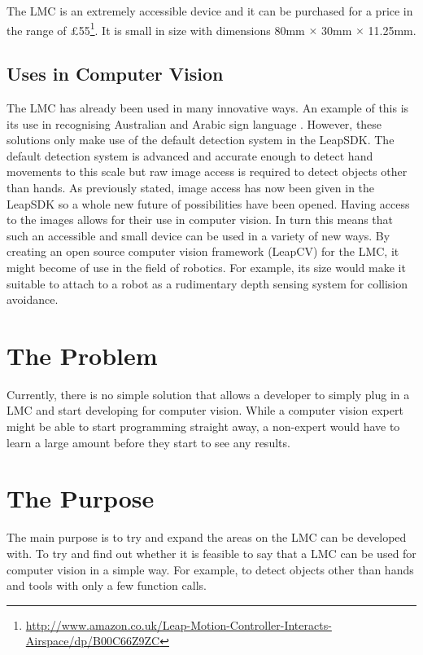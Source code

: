 \documentclass[11pt,oneside]{report}
\begin{document}
				The LMC is an extremely accessible device and it can be purchased for a price in the range of \pounds55\footnote{\url{http://www.amazon.co.uk/Leap-Motion-Controller-Interacts-Airspace/dp/B00C66Z9ZC}}.
				It is small in size with dimensions 80mm $\times$ 30mm $\times$ 11.25mm.				

			\subsection{Uses in Computer Vision}
				The LMC has already been used in many innovative ways.
				An example of this is its use in recognising Australian and Arabic sign language \cite{journal:leapSignLanguage,journal:leapSignLanguage2}.
				However, these solutions only make use of the default detection system in the LeapSDK.
				The default detection system is advanced and accurate enough to detect hand movements to this scale but raw image access is required to detect objects other than hands.
				As previously stated, image access has now been given in the LeapSDK so a whole new future of possibilities have been opened.
				Having access to the images allows for their use in computer vision.
				In turn this means that such an accessible and small device can be used in a variety of new ways.
				By creating an open source computer vision framework (LeapCV) for the LMC, it might become of use in the field of robotics.
				For example, its size would make it suitable to attach to a robot as a rudimentary depth sensing system for collision avoidance.
				
						
		\section{The Problem}
				Currently, there is no simple solution that allows a developer to simply plug in a LMC and start developing for computer vision.
				While a computer vision expert might be able to start programming straight away, a non-expert would have to learn a large amount before they start to see any results.	
				
		\section{The Purpose}
				The main purpose is to try and expand the areas on the LMC can be developed with.
				To try and find out whether it is feasible to say that a LMC can be used for computer vision in a simple way.
				For example, to detect objects other than hands and tools with only a few function calls.
				
\end{document}

